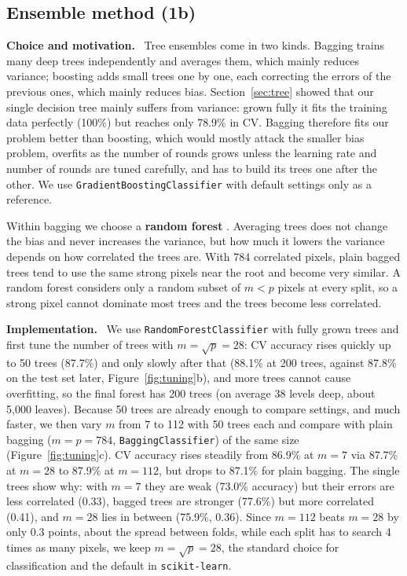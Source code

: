 \documentclass[11pt,a4paper]{article}
\newcommand{\pkg}[1]{\texttt{#1}}
\newcommand{\para}[1]{\textbf{#1}\ }
\begin{document}
\subsection{Ensemble method (1b)}
\label{sec:ensemble}
\para{Choice and motivation.} Tree ensembles come in two kinds. Bagging trains many deep trees independently and averages them, which mainly reduces variance; boosting adds small trees one by one, each correcting the errors of the previous ones, which mainly reduces bias. Section~\ref{sec:tree} showed that our single decision tree mainly suffers from variance: grown fully it fits the training data perfectly (100\%) but reaches only 78.9\% in CV. Bagging therefore fits our problem better than boosting, which would mostly attack the smaller bias problem, overfits as the number of rounds grows unless the learning rate and number of rounds are tuned carefully, and has to build its trees one after the other. We use \pkg{GradientBoostingClassifier} with default settings only as a reference.

Within bagging we choose a \textbf{random forest} \citep{breiman2001}. Averaging trees does not change the bias and never increases the variance, but how much it lowers the variance depends on how correlated the trees are. With 784 correlated pixels, plain bagged trees tend to use the same strong pixels near the root and become very similar. A random forest considers only a random subset of $m<p$ pixels at every split, so a strong pixel cannot dominate most trees and the trees become less correlated.

\para{Implementation.} We use \pkg{RandomForestClassifier} with fully grown trees and first tune the number of trees with $m=\sqrt{p}=28$: CV accuracy rises quickly up to 50 trees (87.7\%) and only slowly after that (88.1\% at 200 trees, against 87.8\% on the test set later, Figure~\ref{fig:tuning}b), and more trees cannot cause overfitting, so the final forest has 200 trees (on average 38 levels deep, about 5{,}000 leaves). Because 50 trees are already enough to compare settings, and much faster, we then vary $m$ from 7 to 112 with 50 trees each and compare with plain bagging ($m=p=784$, \pkg{BaggingClassifier}) of the same size (Figure~\ref{fig:tuning}c). CV accuracy rises steadily from 86.9\% at $m=7$ via 87.7\% at $m=28$ to 87.9\% at $m=112$, but drops to 87.1\% for plain bagging. The single trees show why: with $m=7$ they are weak (73.0\% accuracy) but their errors are less correlated (0.33), bagged trees are stronger (77.6\%) but more correlated (0.41), and $m=28$ lies in between (75.9\%, 0.36). Since $m=112$ beats $m=28$ by only 0.3 points, about the spread between folds, while each split has to search 4 times as many pixels, we keep $m=\sqrt{p}=28$, the standard choice for classification and the default in \pkg{scikit-learn}.
\end{document}
